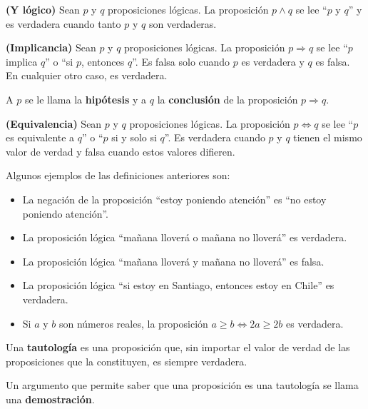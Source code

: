 \begin{definicion}
	\textbf{(Y lógico)} 
	Sean $p$ y $q$ proposiciones lógicas. La proposición $p \wedge q$ se lee ``$p$ y $q$'' y es verdadera cuando tanto $p$ y $q$ son verdaderas. 
\end{definicion}

\begin{definicion}
	\textbf{(Implicancia)}
	Sean $p$ y $q$ proposiciones lógicas. La proposición $p \Rightarrow q$ se lee ``$p$ implica $q$'' o ``si $p$, entonces $q$''. Es falsa solo cuando $p$ es verdadera y $q$ es falsa. En cualquier otro caso, es verdadera. 
	
	A $p$ se le llama la \textbf{hipótesis} y a $q$ la \textbf{conclusión} de la proposición $p\Rightarrow q$. 
\end{definicion}

\begin{definicion}
	\textbf{(Equivalencia)}
	Sean $p$ y $q$ proposiciones lógicas. La proposición $p\Leftrightarrow q$ se lee ``$p$ es equivalente a $q$'' o ``$p$ si y solo si $q$''. Es verdadera cuando $p$ y $q$ tienen el mismo valor de verdad y falsa cuando estos valores difieren. 
\end{definicion}

\begin{ejemplo}
	Algunos ejemplos de las definiciones anteriores son: 
	\begin{itemize}
		\item La negación de la proposición ``estoy poniendo atención'' es ``no estoy poniendo atención''. 
		\item La proposición lógica ``mañana lloverá o mañana no lloverá'' es verdadera.  
		\item La proposición lógica ``mañana lloverá y mañana no lloverá'' es falsa. 
		\item La proposición lógica ``si estoy en Santiago, entonces estoy en Chile'' es verdadera.
		\item Si $a$ y $b$ son números reales, la proposición $a \geq b \Longleftrightarrow 2a \geq 2b$ es verdadera. 
	\end{itemize}
\end{ejemplo}

\begin{definicion}
	Una \textbf{tautología} es una proposición que, sin importar el valor de verdad de las proposiciones que la constituyen, es siempre verdadera. 
	
	Un argumento que permite saber que una proposición es una tautología se llama una \textbf{demostración}. 
\end{definicion}

